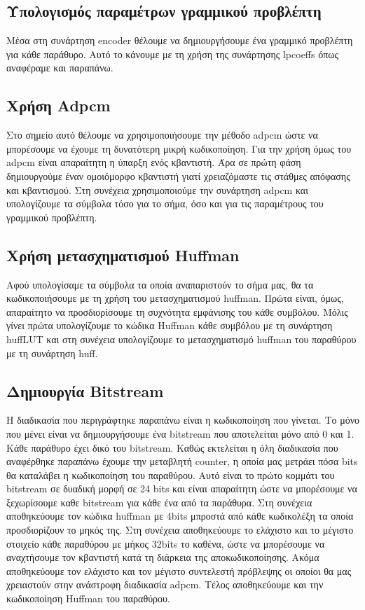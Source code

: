 \subsection{Υπολογισμός παραμέτρων γραμμικού προβλέπτη}
\par Μέσα στη συνάρτηση encoder θέλουμε να δημιουργήσουμε ένα γραμμικό προβλέπτη για 
κάθε παράθυρο. Αυτό το κάνουμε με τη χρήση της συνάρτησης lpcoeffs όπως αναφέραμε και 
παραπάνω.

\subsection{Χρήση Adpcm}
\par Στο σημείο αυτό θέλουμε να χρησιμοποιήσουμε την μέθοδο adpcm ώστε να μπορέσουμε 
να έχουμε τη δυνατότερη μικρή κωδικοποίηση. Για την χρήση όμως του adpcm είναι 
απαραίτητη η ύπαρξη ενός κβαντιστή. Άρα σε πρώτη φάση δημιουργούμε έναν ομοιόμορφο 
κβαντιστή γιατί χρειαζόμαστε τις στάθμες απόφασης και κβαντισμού. Στη συνέχεια 
χρησιμοποιούμε την συνάρτηση adpcm και υπολογίζουμε τα σύμβολα τόσο για το σήμα, 
όσο και για τις παραμέτρους του γραμμικού προβλέπτη.

\subsection{Χρήση μετασχηματισμού Huffman}
\par Αφού υπολογίσαμε τα σύμβολα τα οποία αναπαριστούν το σήμα μας, θα τα 
κωδικοποιήσουμε με τη χρήση του μετασχηματισμού huffman. Πρώτα είναι, όμως, 
απαραίτητο να προσδιορίσουμε τη συχνότητα εμφάνισης του κάθε συμβόλου. Μόλις 
γίνει πρώτα υπολογίζουμε το κώδικα Huffman κάθε συμβόλου με τη συνάρτηση huffLUT 
και στη συνέχεια υπολογίζουμε το μετασχηματισμό huffman του παραθύρου με τη συνάρτηση 
huff.

\subsection{Δημιουργία Bitstream}
\par Η διαδικασία που περιγράφτηκε παραπάνω είναι η κωδικοποίηση που γίνεται. Το 
μόνο που μένει είναι να δημιουργήσουμε ένα bitstream που αποτελείται μόνο από 0 
και 1. Κάθε παράθυρο έχει δικό του bitstream. Καθώς εκτελείται η όλη διαδικασία 
που αναφέρθηκε παραπάνω έχουμε την μεταβλητή counter, η οποία μας μετράει πόσα 
bits θα καταλάβει η κωδικοποίηση του παραθύρου. Αυτό είναι το πρώτο κομμάτι του bitstream 
σε δυαδική μορφή σε 24 bits και είναι απαραίτητη ώστε να μπορέσουμε να ξεχωρίσουμε 
καθε bitstream για κάθε ένα από τα παράθυρα. Στη συνέχεια αποθηκεύουμε τον κώδικα huffman 
με 4bits μπροστά από κάθε κωδικολέξη τα οποία προσδιορίζουν το μηκός της. Στη συνέχεια 
αποθηκεύουμε το ελάχιστο και το μέγιστο στοιχείο κάθε παραθύρου με μήκος 32bits το καθένα, ώστε να 
μπορέσουμε να αναχτήσουμε τον κβαντιστή κατά τη διάρκεια της αποκωδικοποίησης. Ακόμα 
αποθηκεύουμε τον ελάχιστο και τον μέγιστο συντελεστή πρόβλεψης οι οποίοι θα μας χρειαστούν 
στην ανάστροφη διαδικασία adpcm. Τέλος αποθηκεύουμε και την κωδικοποίηση Huffman του 
παραθύρου.

